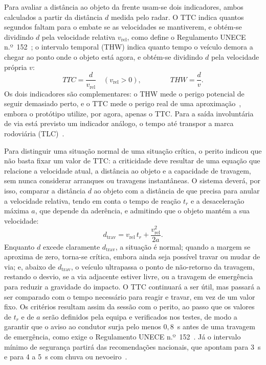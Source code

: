 Para avaliar a distância ao objeto da frente usam-se dois indicadores,
ambos calculados a partir da distância $d$ medida pelo radar. O TTC indica
quantos segundos faltam para o embate se as velocidades
se mantiverem, e obtém-se dividindo $d$ pela velocidade relativa
$v_{\mathrm{rel}}$, como define o Regulamento UNECE n.º~152~\cite{unr152};
o intervalo temporal (THW) indica quanto tempo o veículo demora a chegar ao
ponto onde o objeto está agora, e obtém-se dividindo $d$ pela velocidade
própria $v$:
\begin{equation}
  \mathit{TTC} = \frac{d}{v_{\mathrm{rel}}} \quad (v_{\mathrm{rel}} > 0),
  \qquad\qquad
  \mathit{THW} = \frac{d}{v}.
  \label{eq:ttc-thw}
\end{equation}
Os dois indicadores são complementares: o THW mede o perigo potencial de
seguir demasiado perto, e o TTC mede o perigo real de uma
aproximação~\cite{vogel2003}, embora o protótipo utilize, por agora,
apenas o TTC. Para a saída involuntária de via está previsto um
indicador análogo, o tempo até transpor a marca rodoviária
(TLC)~\cite{mammar2006}.

Para distinguir uma situação normal de uma situação crítica, o perito
indicou que não basta fixar um valor de TTC: a criticidade deve resultar de
uma equação que relacione a velocidade atual, a distância ao objeto e a
capacidade de travagem, sem nunca considerar arranques ou travagens
instantâneas. O sistema deverá, por isso, comparar a distância
$d$ ao objeto com a distância de que precisa para anular a velocidade
relativa, tendo em conta o tempo de reação $t_r$ e a desaceleração máxima
$a$, que depende da aderência, e admitindo que o objeto mantém a sua
velocidade:
\begin{equation}
  d_{\mathrm{trav}} = v_{\mathrm{rel}}\,t_r + \frac{v_{\mathrm{rel}}^{2}}{2a}.
  \label{eq:dtrav}
\end{equation}
Enquanto $d$ excede claramente $d_{\mathrm{trav}}$, a situação é normal;
quando a margem se aproxima de zero, torna-se crítica, embora ainda seja
possível travar ou mudar de via; e, abaixo de $d_{\mathrm{trav}}$, o
veículo ultrapassa o ponto de não-retorno da travagem, restando o desvio,
se a via adjacente estiver livre, ou a travagem de emergência para reduzir
a gravidade do impacto. O TTC continuará a ser útil, mas passará a ser
comparado com o tempo necessário para reagir e travar, em vez de um valor
fixo. Os critérios resultam assim da sessão com o perito, ao passo que os
valores de $t_r$ e de $a$ serão definidos pela equipa e verificados nos
testes, de modo a garantir que o aviso ao condutor surja pelo menos $0,8$~s antes
de uma travagem de emergência, como exige o Regulamento UNECE
n.º~152~\cite{unr152}. Já o intervalo mínimo de segurança partirá das
recomendações nacionais, que apontam para 3~s e para 4 a 5~s com chuva ou
nevoeiro~\cite{prp2025}.

